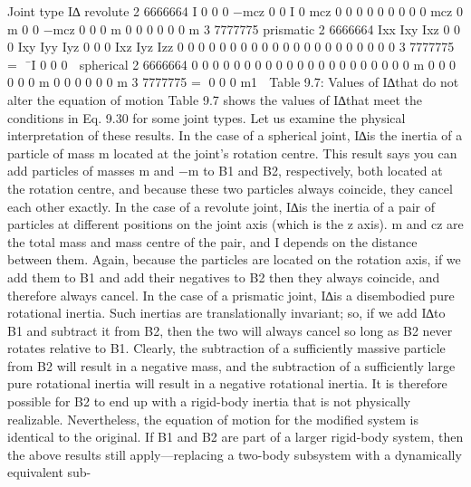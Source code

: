 Joint type I∆ revolute 2 6666664 I 0 0 0 −mcz 0 0 I 0 mcz 0 0 0 0 0 0 0 0 0 mcz 0 m 0 0 −mcz 0 0 0 m 0 0 0 0 0 0 m 3 7777775 prismatic 2 6666664 Ixx Ixy Ixz 0 0 0 Ixy Iyy Iyz 0 0 0 Ixz Iyz Izz 0 0 0 0 0 0 0 0 0 0 0 0 0 0 0 0 0 0 0 0 0 3 7777775 = ¯I 0 0 0  spherical 2 6666664 0 0 0 0 0 0 0 0 0 0 0 0 0 0 0 0 0 0 0 0 0 m 0 0 0 0 0 0 m 0 0 0 0 0 0 m 3 7777775 = 0 0 0 m1  Table 9.7: Values of I∆that do not alter the equation of motion Table 9.7 shows the values of I∆that meet the conditions in Eq. 9.30 for some joint types. Let us examine the physical interpretation of these results. In the case of a spherical joint, I∆is the inertia of a particle of mass m located at the joint’s rotation centre. This result says you can add particles of masses m and −m to B1 and B2, respectively, both located at the rotation centre, and because these two particles always coincide, they cancel each other exactly. In the case of a revolute joint, I∆is the inertia of a pair of particles at different positions on the joint axis (which is the z axis). m and cz are the total mass and mass centre of the pair, and I depends on the distance between them. Again, because the particles are located on the rotation axis, if we add them to B1 and add their negatives to B2 then they always coincide, and therefore always cancel. In the case of a prismatic joint, I∆is a disembodied pure rotational inertia. Such inertias are translationally invariant; so, if we add I∆to B1 and subtract it from B2, then the two will always cancel so long as B2 never rotates relative to B1. Clearly, the subtraction of a sufficiently massive particle from B2 will result in a negative mass, and the subtraction of a sufficiently large pure rotational inertia will result in a negative rotational inertia. It is therefore possible for B2 to end up with a rigid-body inertia that is not physically realizable. Nevertheless, the equation of motion for the modified system is identical to the original. If B1 and B2 are part of a larger rigid-body system, then the above results still apply—replacing a two-body subsystem with a dynamically equivalent sub-

